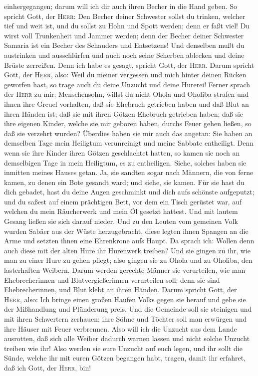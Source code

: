 einhergegangen; darum will ich dir auch ihren Becher in die Hand geben.
 So spricht Gott, der \textsc{Herr}: Den Becher deiner
Schwester sollst du trinken, welcher tief und weit ist, und du sollst zu
Hohn und Spott werden; denn er faßt viel!  Du wirst voll
Trunkenheit und Jammer werden; denn der Becher deiner Schwester Samaria
ist ein Becher des Schauders und Entsetzens!  Und
denselben mußt du austrinken und ausschlürfen und auch noch seine
Scherben ablecken und deine Brüste zerreißen. Denn ich habe es gesagt,
spricht Gott, der \textsc{Herr}.  Darum spricht Gott, der
\textsc{Herr}, also: Weil du meiner vergessen und mich hinter deinen
Rücken geworfen hast, so trage auch du deine Unzucht und deine Hurerei!
 Ferner sprach der \textsc{Herr} zu mir: Menschensohn,
willst du nicht Ohola und Oholiba strafen und ihnen ihre Greuel
vorhalten,  daß sie Ehebruch getrieben haben und daß Blut
an ihren Händen ist; daß sie mit ihren Götzen Ehebruch getrieben haben;
daß sie ihre eigenen Kinder, welche sie mir geboren haben, durchs Feuer
gehen ließen, so daß sie verzehrt wurden?  Überdies haben
sie mir auch das angetan: Sie haben an demselben Tage mein Heiligtum
verunreinigt und meine Sabbate entheiligt.  Denn wenn sie
ihre Kinder ihren Götzen geschlachtet hatten, so kamen sie noch an
demselbigen Tage in mein Heiligtum, es zu entheiligen. Siehe, solches
haben sie inmitten meines Hauses getan.  Ja, sie sandten
sogar nach Männern, die von ferne kamen, zu denen ein Bote gesandt ward;
und siehe, sie kamen. Für sie hast du dich gebadet, hast du deine Augen
geschminkt und dich aufs schönste aufgeputzt;  und du
saßest auf einem prächtigen Bett, vor dem ein Tisch gerüstet war, auf
welchen du mein Räucherwerk und mein Öl gesetzt hattest. 
Und mit lautem Gesang ließen sie sich darauf nieder. Und zu den Leuten
vom gemeinen Volk wurden Sabäer aus der Wüste herzugebracht, diese
legten ihnen Spangen an die Arme und setzten ihnen eine Ehrenkrone aufs
Haupt.  Da sprach ich: Wollen denn auch diese mit der
alten Hure ihr Hurenwerk treiben?  Und sie gingen zu ihr,
wie man zu einer Hure zu gehen pflegt; also gingen sie zu Ohola und zu
Oholiba, den lasterhaften Weibern.  Darum werden gerechte
Männer sie verurteilen, wie man Ehebrecherinnen und Blutvergießerinnen
verurteilen soll; denn sie sind Ehebrecherinnen, und Blut klebt an ihren
Händen.  Darum spricht Gott, der \textsc{Herr}, also: Ich
bringe einen großen Haufen Volks gegen sie herauf und gebe sie der
Mißhandlung und Plünderung preis.  Und die Gemeinde soll
sie steinigen und mit ihren Schwertern zerhauen; ihre Söhne und Töchter
soll man erwürgen und ihre Häuser mit Feuer verbrennen. 
Also will ich die Unzucht aus dem Lande ausrotten, daß sich alle Weiber
dadurch warnen lassen und nicht solche Unzucht treiben wie ihr!
 Also werden sie eure Unzucht auf euch legen, und ihr
sollt die Sünde, welche ihr mit euren Götzen begangen habt, tragen,
damit ihr erfahret, daß ich Gott, der \textsc{Herr}, bin!

